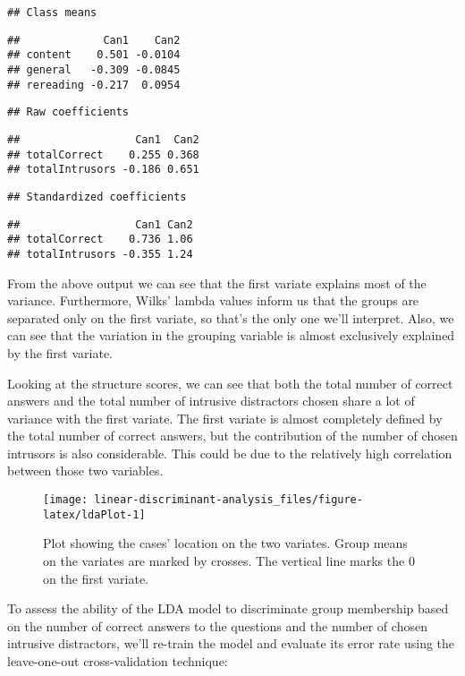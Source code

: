 \documentclass[11pt,]{article}
\begin{document}
\begin{verbatim}
## Class means
\end{verbatim}

\begin{verbatim}
##             Can1    Can2
## content    0.501 -0.0104
## general   -0.309 -0.0845
## rereading -0.217  0.0954
\end{verbatim}

\begin{verbatim}
## Raw coefficients
\end{verbatim}

\begin{verbatim}
##                  Can1  Can2
## totalCorrect    0.255 0.368
## totalIntrusors -0.186 0.651
\end{verbatim}

\begin{verbatim}
## Standardized coefficients
\end{verbatim}

\begin{verbatim}
##                  Can1 Can2
## totalCorrect    0.736 1.06
## totalIntrusors -0.355 1.24
\end{verbatim}

From the above output we can see that the first variate explains most of
the variance. Furthermore, Wilks' lambda values inform us that the
groups are separated only on the first variate, so that's the only one
we'll interpret. Also, we can see that the variation in the grouping
variable is almost exclusively explained by the first variate.

Looking at the structure scores, we can see that both the total number
of correct answers and the total number of intrusive distractors chosen
share a lot of variance with the first variate. The first variate is
almost completely defined by the total number of correct answers, but
the contribution of the number of chosen intrusors is also considerable.
This could be due to the relatively high correlation between those two
variables.

\begin{figure*}
\texttt{[image: linear-discriminant-analysis\_files/figure-latex/ldaPlot-1]} \caption{\label{ldaPlot1}Plot showing the cases' location on the two variates. Group means on the variates are marked by crosses. The vertical line marks the 0 on the first variate.}\label{fig:ldaPlot}
\end{figure*}

To assess the ability of the LDA model to discriminate group membership
based on the number of correct answers to the questions and the number
of chosen intrusive distractors, we'll re-train the model and evaluate
its error rate using the leave-one-out cross-validation technique:
\end{document}
